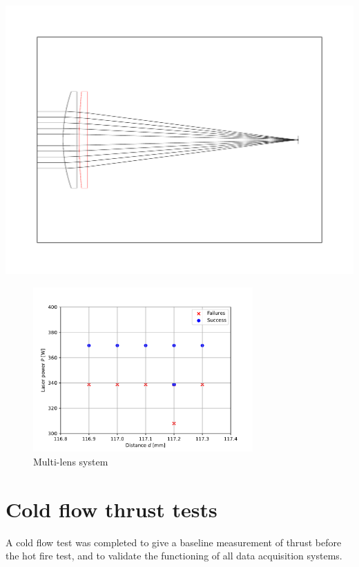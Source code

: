         \includegraphics[width=\textwidth]{assets/5 results/500 and 150 lenses.pdf}

        \begin{figure}[h]
            \centering
            \includegraphics[width=0.75\textwidth]{assets/5 results/duallens_focus_threshold.pdf}
            \caption{Multi-lens system}
        \end{figure}

    
    \section{Cold flow thrust tests}

    A cold flow test was completed to give a baseline measurement of thrust before the hot fire test, and to validate the functioning of all data acquisition systems.